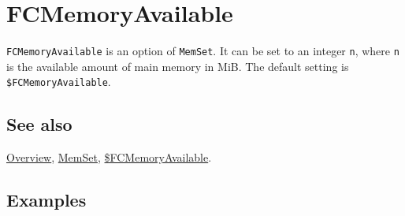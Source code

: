 \documentclass[../FeynCalcManual.tex]{subfiles}
\begin{document}
\hypertarget{fcmemoryavailable}{
\section{FCMemoryAvailable}\label{fcmemoryavailable}}

\texttt{FCMemoryAvailable} is an option of \texttt{MemSet}. It can be
set to an integer \texttt{n}, where \texttt{n} is the available amount
of main memory in MiB. The default setting is
\texttt{\$FCMemoryAvailable}.

\subsection{See also}

\hyperlink{toc}{Overview}, \hyperlink{memset}{MemSet},
\hyperlink{dollarfcmemoryavailable}{\$FCMemoryAvailable}.

\subsection{Examples}
\end{document}

